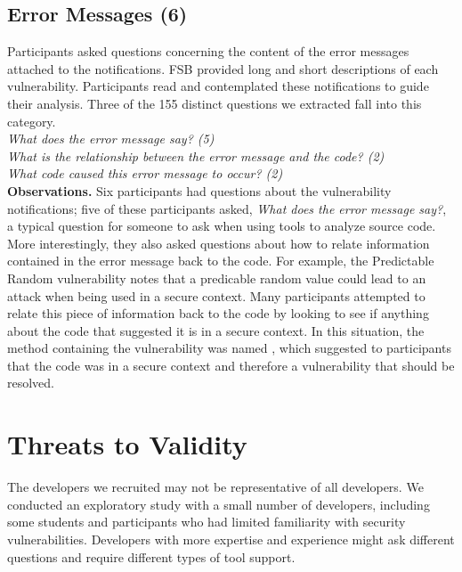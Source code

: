 \documentclass[conference]{IEEEtran}
\begin{document}

\noindent\subsection{\textbf{Error Messages (6)}}\label{em}

Participants asked questions concerning the content of the error messages attached to the notifications. 
FSB provided long and short descriptions of each vulnerability. 
Participants read and contemplated these notifications to guide their analysis.
Three of the 155 distinct questions we extracted fall into this category.
\\

\noindent\emph{What does the error message say? (5)} \\
\emph{What is the relationship between the error message and the code? (2)} \\
\emph{What code caused this error message to occur? (2)} \\

\noindent\textbf{Observations.}
Six participants had questions about the vulnerability notifications; five of these participants asked, \textit{What does the error message say?}, a typical question for someone to ask when using tools to analyze source code.
More interestingly, they also asked questions about how to relate information contained in the error message back to the code. 
For example, the Predictable Random vulnerability notes that a predicable random value could lead to an attack when being used in a secure context. 
Many participants attempted to relate this piece of information back to the code by looking to see if anything about the code that suggested it is in a secure context. 
In this situation, the method containing the vulnerability was named , which suggested to participants that the code was in a secure context and therefore a vulnerability that should be resolved.
\\



\section{Threats to Validity}
\label{limits}
The developers we recruited may not be representative of all developers.
We conducted an exploratory study with a small number of developers, including some students and participants who had limited familiarity with security vulnerabilities.
Developers with more expertise and experience might ask different questions and require different types of tool support.
\end{document}
